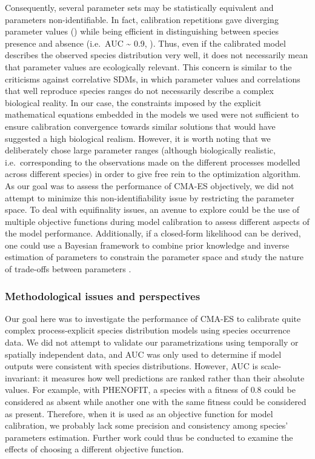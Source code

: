 Consequently, several parameter sets may be statistically equivalent and
parameters non-identifiable. In fact, calibration repetitions gave
diverging parameter values ()
while being efficient in distinguishing between species presence and
absence (i.e.~AUC \textasciitilde{} 0.9,
). Thus, even if the calibrated
model describes the observed species distribution very well, it does not
necessarily mean that parameter values are ecologically relevant. This
concern is similar to the criticisms against correlative SDMs, in which
parameter values and correlations that well reproduce species ranges do
not necessarily describe a complex biological reality. In our case, the
constraints imposed by the explicit mathematical equations embedded in
the models we used were not sufficient to ensure calibration convergence
towards similar solutions that would have suggested a high biological
realism. However, it is worth noting that we deliberately chose large
parameter ranges (although biologically realistic, i.e.~corresponding to
the observations made on the different processes modelled across
different species) in order to give free rein to the optimization
algorithm. As our goal was to assess the performance of CMA-ES
objectively, we did not attempt to minimize this non-identifiability
issue by restricting the parameter space. To deal with equifinality
issues, an avenue to explore could be the use of multiple objective
functions during model calibration to assess different aspects of the
model performance. Additionally, if a closed-form likelihood can be
derived, one could use a Bayesian framework to combine prior knowledge
and inverse estimation of parameters to constrain the parameter space
and study the nature of trade-offs between parameters
\citep{Hartig2012, Cailleret2020}.

\subsubsection{Methodological issues and perspectives}\label{methodological-issues-and-perspectives}

Our goal here was to investigate the performance of CMA-ES to calibrate
quite complex process-explicit species distribution models using species
occurrence data. We did not attempt to validate our parametrizations
using temporally or spatially independent data, and AUC was only used to
determine if model outputs were consistent with species distributions.
However, AUC is scale-invariant: it measures how well predictions are
ranked rather than their absolute values. For example, with PHENOFIT, a
species with a fitness of \(0.8\) could be considered as absent while
another one with the same fitness could be considered as present.
Therefore, when it is used as an objective function for model
calibration, we probably lack some precision and consistency among
species' parameters estimation. Further work could thus be conducted to
examine the effects of choosing a different objective function.

